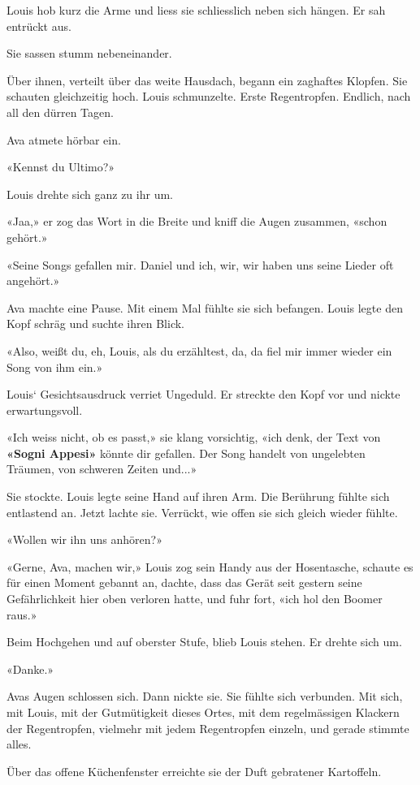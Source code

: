 Louis hob kurz die Arme und liess sie schliesslich neben sich hängen. Er
sah entrückt aus.

Sie sassen stumm nebeneinander.

Über ihnen, verteilt über das weite Hausdach, begann ein zaghaftes
Klopfen. Sie schauten gleichzeitig hoch. Louis schmunzelte. Erste
Regentropfen. Endlich, nach all den dürren Tagen.

Ava atmete hörbar ein.

«Kennst du Ultimo?»

Louis drehte sich ganz zu ihr um.

«Jaa,» er zog das Wort in die Breite und kniff die Augen zusammen,
«schon gehört.»

«Seine Songs gefallen mir. Daniel und ich, wir, wir haben uns seine
Lieder oft angehört.»

Ava machte eine Pause. Mit einem Mal fühlte sie sich befangen. Louis
legte den Kopf schräg und suchte ihren Blick.

«Also, weißt du, eh, Louis, als du erzähltest, da, da fiel mir immer
wieder ein Song von ihm ein.»

Louis` Gesichtsausdruck verriet Ungeduld. Er streckte den Kopf vor und
nickte erwartungsvoll.

«Ich weiss nicht, ob es passt,» sie klang vorsichtig, «ich denk, der
Text von \textbf{«Sogni Appesi»} könnte dir gefallen. Der Song handelt
von ungelebten Träumen, von schweren Zeiten und...»

Sie stockte. Louis legte seine Hand auf ihren Arm. Die Berührung fühlte
sich entlastend an. Jetzt lachte sie. Verrückt, wie offen sie sich
gleich wieder fühlte.

«Wollen wir ihn uns anhören?»

«Gerne, Ava, machen wir,» Louis zog sein Handy aus der Hosentasche,
schaute es für einen Moment gebannt an, dachte, dass das Gerät seit
gestern seine Gefährlichkeit hier oben verloren hatte, und fuhr fort,
«ich hol den Boomer raus.»

Beim Hochgehen und auf oberster Stufe, blieb Louis stehen. Er drehte
sich um.

«Danke.»

Avas Augen schlossen sich. Dann nickte sie. Sie fühlte sich verbunden.
Mit sich, mit Louis, mit der Gutmütigkeit dieses Ortes, mit dem
regelmässigen Klackern der Regentropfen, vielmehr mit jedem Regentropfen
einzeln, und gerade stimmte alles.

Über das offene Küchenfenster erreichte sie der Duft gebratener
Kartoffeln.

